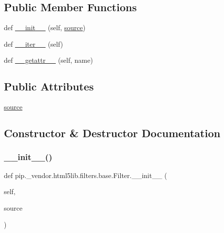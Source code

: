 \subsection*{Public Member Functions}
\begin{DoxyCompactItemize}
\item 
def \hyperlink{classpip_1_1__vendor_1_1html5lib_1_1filters_1_1base_1_1Filter_a1bbfdad265c0112cda0ad513764e854a}{\+\_\+\+\_\+init\+\_\+\+\_\+} (self, \hyperlink{classpip_1_1__vendor_1_1html5lib_1_1filters_1_1base_1_1Filter_aedf7f8b39d6bd2b443f81db8fcc14060}{source})
\item 
def \hyperlink{classpip_1_1__vendor_1_1html5lib_1_1filters_1_1base_1_1Filter_aac8e051bddd236b57d109024bdfb5343}{\+\_\+\+\_\+iter\+\_\+\+\_\+} (self)
\item 
def \hyperlink{classpip_1_1__vendor_1_1html5lib_1_1filters_1_1base_1_1Filter_ab632746d6a36554fc82a9f205179cad3}{\+\_\+\+\_\+getattr\+\_\+\+\_\+} (self, name)
\end{DoxyCompactItemize}
\subsection*{Public Attributes}
\begin{DoxyCompactItemize}
\item 
\hyperlink{classpip_1_1__vendor_1_1html5lib_1_1filters_1_1base_1_1Filter_aedf7f8b39d6bd2b443f81db8fcc14060}{source}
\end{DoxyCompactItemize}


\subsection{Constructor \& Destructor Documentation}
\mbox{\label{classpip_1_1__vendor_1_1html5lib_1_1filters_1_1base_1_1Filter_a1bbfdad265c0112cda0ad513764e854a}} 
\subsubsection{\texorpdfstring{\+\_\+\+\_\+init\+\_\+\+\_\+()}{\_\_init\_\_()}}
{\footnotesize\ttfamily def pip.\+\_\+vendor.\+html5lib.\+filters.\+base.\+Filter.\+\_\+\+\_\+init\+\_\+\+\_\+ (\begin{DoxyParamCaption}\item[{}]{self,  }\item[{}]{source }\end{DoxyParamCaption})}



